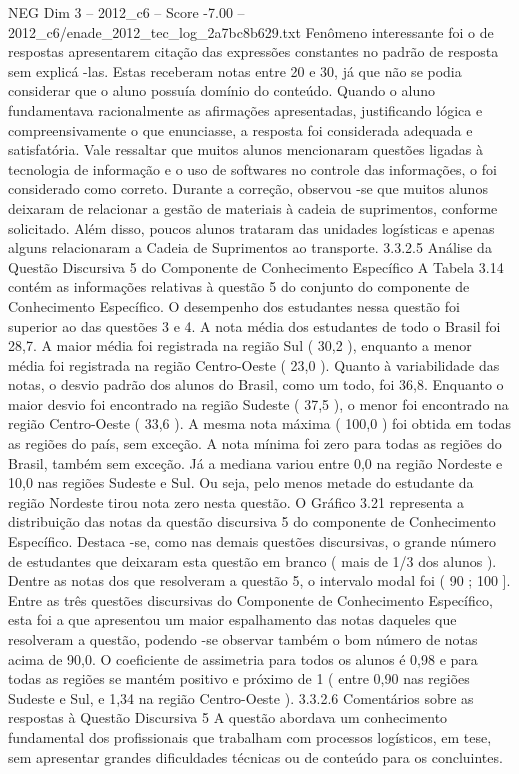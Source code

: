 \begin{textsample}{NEG Dim 3 – 2012\_c6 – Score -7.00 – 2012\_c6/enade\_2012\_tec\_log\_2a7bc8b629.txt}
Fenômeno interessante foi o de respostas apresentarem citação das expressões constantes no padrão de resposta sem explicá -las.
Estas receberam notas entre 20 e 30, já que não se podia considerar que o aluno possuía domínio do conteúdo.
Quando o aluno fundamentava racionalmente as afirmações apresentadas, justificando lógica e compreensivamente o que enunciasse, a resposta foi considerada adequada e satisfatória.
Vale ressaltar que muitos alunos mencionaram questões ligadas à tecnologia de informação e o uso de softwares no controle das informações, o foi considerado como correto.
Durante a correção, observou -se que muitos alunos deixaram de relacionar a gestão de materiais à cadeia de suprimentos, conforme solicitado.
Além disso, poucos alunos trataram das unidades logísticas e apenas alguns relacionaram a Cadeia de Suprimentos ao transporte. 3.3.2.5 Análise da Questão Discursiva 5 do Componente de Conhecimento Específico A Tabela 3.14 contém as informações relativas à questão 5 do conjunto do componente de Conhecimento Específico.
O desempenho dos estudantes nessa questão foi superior ao das questões 3 e 4.
A nota média dos estudantes de todo o Brasil foi 28,7.
A maior média foi registrada na região Sul ( 30,2 ), enquanto a menor média foi registrada na região Centro-Oeste ( 23,0 ).
Quanto à variabilidade das notas, o desvio padrão dos alunos do Brasil, como um todo, foi 36,8.
Enquanto o maior desvio foi encontrado na região Sudeste ( 37,5 ), o menor foi encontrado na região Centro-Oeste ( 33,6 ).
A mesma nota máxima ( 100,0 ) foi obtida em todas as regiões do país, sem exceção.
A nota mínima foi zero para todas as regiões do Brasil, também sem exceção.
Já a mediana variou entre 0,0 na região Nordeste e 10,0 nas regiões Sudeste e Sul.
Ou seja, pelo menos metade do estudante da região Nordeste tirou nota zero nesta questão.
O Gráfico 3.21 representa a distribuição das notas da questão discursiva 5 do componente de Conhecimento Específico.
Destaca -se, como nas demais questões discursivas, o grande número de estudantes que deixaram esta questão em branco ( mais de 1/3 dos alunos ).
Dentre as notas dos que resolveram a questão 5, o intervalo modal foi ( 90 ; 100 ].
Entre as três questões discursivas do Componente de Conhecimento Específico, esta foi a que apresentou um maior espalhamento das notas daqueles que resolveram a questão, podendo -se observar também o bom número de notas acima de 90,0.
O coeficiente de assimetria para todos os alunos é 0,98 e para todas as regiões se mantém positivo e próximo de 1 ( entre 0,90 nas regiões Sudeste e Sul, e 1,34 na região Centro-Oeste ). 3.3.2.6 Comentários sobre as respostas à Questão Discursiva 5 A questão abordava um conhecimento fundamental dos profissionais que trabalham com processos logísticos, em tese, sem apresentar grandes dificuldades técnicas ou de conteúdo para os concluintes.

\end{textsample}
